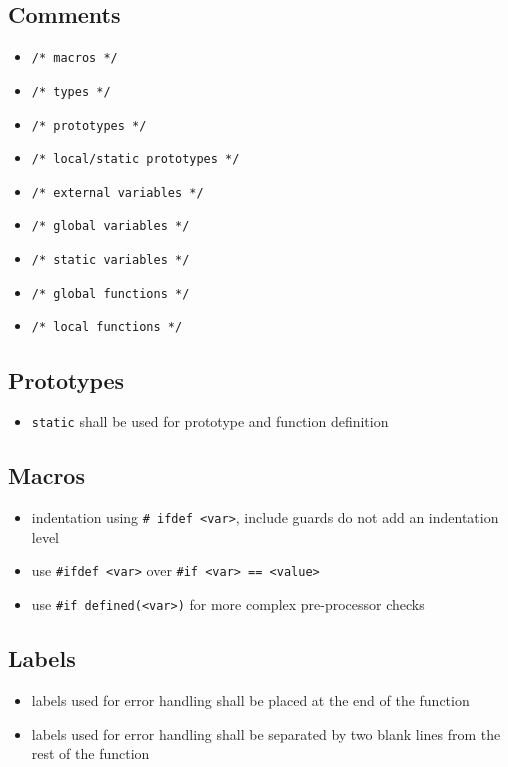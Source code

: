 \subsection{Comments}
	\begin{itemize}
		\item \lstinline{/* macros */}
		\item \lstinline{/* types */}
		\item \lstinline{/* prototypes */}
		\item \lstinline{/* local/static prototypes */}
		\item \lstinline{/* external variables */}
		\item \lstinline{/* global variables */}
		\item \lstinline{/* static variables */}
		\item \lstinline{/* global functions */}
		\item \lstinline{/* local functions */}
	\end{itemize}
	
\subsection{Prototypes}
	\begin{itemize}
		\item \lstinline{static} shall be used for prototype and function definition
	\end{itemize}

\subsection{Macros}
	\begin{itemize}
		\item indentation using \lstinline{# ifdef <var>}, include guards do not add an indentation level
		\item use \lstinline{#ifdef <var>} over \lstinline{#if <var> == <value>}
		\item use \lstinline{#if defined(<var>)} for more complex pre-processor checks
	\end{itemize}

\subsection{Labels}
	\begin{itemize}
		\item labels used for error handling shall be placed at the end of the function
		\item labels used for error handling shall be separated by two blank lines from the rest of the function
	\end{itemize}
